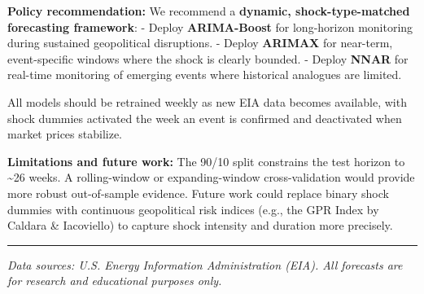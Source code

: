 \documentclass[
]{article}
\begin{document}
\textbf{Policy recommendation:} We recommend a \textbf{dynamic,
shock-type-matched forecasting framework}: - Deploy \textbf{ARIMA-Boost}
for long-horizon monitoring during sustained geopolitical disruptions. -
Deploy \textbf{ARIMAX} for near-term, event-specific windows where the
shock is clearly bounded. - Deploy \textbf{NNAR} for real-time
monitoring of emerging events where historical analogues are limited.

All models should be retrained weekly as new EIA data becomes available,
with shock dummies activated the week an event is confirmed and
deactivated when market prices stabilize.

\textbf{Limitations and future work:} The 90/10 split constrains the
test horizon to \textasciitilde26 weeks. A rolling-window or
expanding-window cross-validation would provide more robust
out-of-sample evidence. Future work could replace binary shock dummies
with continuous geopolitical risk indices (e.g., the GPR Index by
Caldara \& Iacoviello) to capture shock intensity and duration more
precisely.

\begin{center}\rule{0.5\linewidth}{0.5pt}\end{center}

\emph{Data sources: U.S. Energy Information Administration (EIA). All
forecasts are for research and educational purposes only.}
\end{document}
